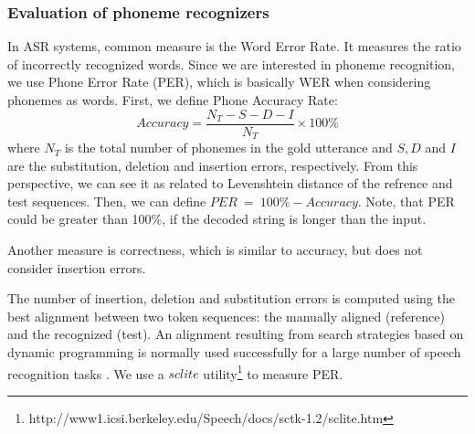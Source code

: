 \subsubsection{Evaluation of phoneme recognizers}
\label{p-eval}
In ASR systems, common measure is the Word Error Rate.
It measures the ratio of incorrectly recognized words.
Since we are interested in phoneme recognition, we use Phone Error Rate (PER), which is basically WER when considering phonemes as words.
First, we define Phone Accuracy Rate:
\begin{equation}
Accuracy = \frac{N_T - S - D - I}{N_T} \times 100\%
\end{equation}
where $N_T$ is the total number of phonemes in the gold utterance and $S, D$ and $I$ are the substitution, deletion and insertion errors, respectively.
From this perspective, we can see it as related to Levenshtein distance of the refrence and test sequences.
Then, we can define $PER \: = \: 100\% - Accuracy$.
Note, that PER could be greater than 100\%, if the decoded string is longer than the input.
\par
Another measure is correctness, which is similar to accuracy, but does not consider insertion errors.
\par
The number of insertion, deletion and substitution errors is computed using the best alignment between two token sequences: the manually aligned (reference) and the recognized (test).
An alignment resulting from search strategies based on dynamic programming is normally used successfully for a large number of speech recognition tasks \cite{ney2000progress}.
We use a $sclite$ utility\footnote{http://www1.icsi.berkeley.edu/Speech/docs/sctk-1.2/sclite.htm} to measure PER.
